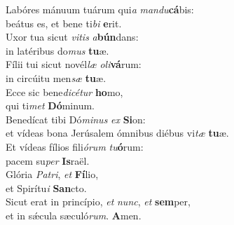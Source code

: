 \evenverse Labóres mánuum tuárum qui\textit{a} \textit{man}\textit{du}\textbf{cá}bis:~\*\\
\evenverse beátus es, et bene ti\textit{bi} \textbf{e}rit.\\
\oddverse Uxor tua sicut \textit{vi}\textit{tis} \textit{a}\textbf{bún}dans:~\*\\
\oddverse in latéribus do\textit{mus} \textbf{tu}æ.\\
\evenverse Fílii tui sicut novél\textit{læ} \textit{o}\textit{li}\textbf{vá}rum:~\*\\
\evenverse in circúitu men\textit{sæ} \textbf{tu}æ.\\
\oddverse Ecce sic bene\textit{di}\textit{cé}\textit{tur} \textbf{ho}mo,~\*\\
\oddverse qui ti\textit{met} \textbf{Dó}minum.\\
\evenverse Benedícat tibi Dó\textit{mi}\textit{nus} \textit{ex} \textbf{Si}on:~\*\\
\evenverse et vídeas bona Jerúsalem ómnibus diébus vi\textit{tæ} \textbf{tu}æ.\\
\oddverse Et vídeas fílios fili\textit{ó}\textit{rum} \textit{tu}\textbf{ó}rum:~\*\\
\oddverse pacem su\textit{per} \textbf{Is}raël.\\
\evenverse Glória \textit{Pa}\textit{tri}, \textit{et} \textbf{Fí}lio,~\*\\
\evenverse et Spirítu\textit{i} \textbf{San}cto.\\
\oddverse Sicut erat in princípio, \textit{et} \textit{nunc}, \textit{et} \textbf{sem}per,~\*\\
\oddverse et in sǽcula sæculó\textit{rum}. \textbf{A}men.\\
